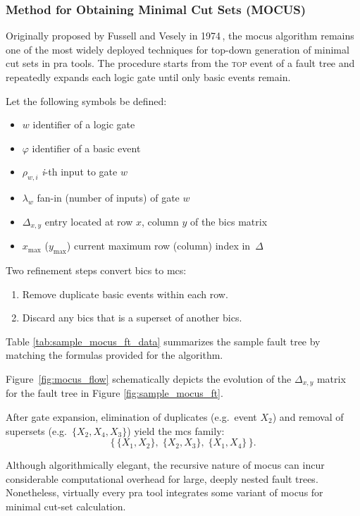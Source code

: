 \subsubsection{Method for Obtaining Minimal Cut Sets (MOCUS)}

Originally proposed by Fussell and Vesely in 1974\,\cite{Fussell1974MOCUS}, the \acrshort{mocus} algorithm remains one of the most widely deployed techniques for top-down generation of minimal cut sets in \acrshort{pra} tools. The procedure starts from the \textsc{top} event of a fault tree and repeatedly expands each logic gate until only basic events remain.

Let the following symbols be defined:
\begin{itemize}
  \item $w$ identifier of a logic gate
  \item $\varphi$ identifier of a basic event
  \item $\rho_{w,i}$ \emph{i}-th input to gate $w$
  \item $\lambda_{w}$ fan-in (number of inputs) of gate $w$
  \item $\Delta_{x,y}$ entry located at row $x$, column $y$ of the \acrfull{bics} matrix
  \item $x_{\max}$ ($y_{\max}$) current maximum row (column) index in~$\Delta$
\end{itemize}



Two refinement steps convert \acrshort{bics} to \acrshort{mcs}:
\begin{enumerate}
  \item Remove duplicate basic events within each row.
  \item Discard any \acrshort{bics} that is a superset of another \acrshort{bics}.
\end{enumerate}



% 

Table \ref{tab:sample_mocus_ft_data} summarizes the sample fault tree by matching the formulas provided for the algorithm.



Figure~\ref{fig:mocus_flow} schematically depicts the evolution of the $\Delta_{x,y}$ matrix for the fault tree in Figure \ref{fig:sample_mocus_ft}. 

After gate expansion, elimination of duplicates (e.g.\ event $X_2$) and removal of supersets (e.g.\ $\{X_2,X_4,X_3\}$) yield the \acrshort{mcs} family:
\[
  \bigl\{\,\{X_1,X_2\},\; \{X_2,X_3\},\; \{X_1,X_4\}\,\bigr\}.
\]



Although algorithmically elegant, the recursive nature of \acrshort{mocus} can incur considerable computational overhead for large, deeply nested fault trees.  Nonetheless, virtually every \acrshort{pra} tool integrates some variant of \acrshort{mocus} for minimal cut-set calculation.
